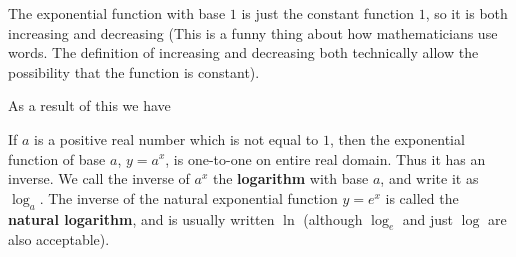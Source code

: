 \documentclass{ximera}
\begin{document}
The exponential function with base $1$ is just the constant function $1$, so it is both increasing and decreasing (This is a funny thing about how mathematicians use words.  The definition of increasing and decreasing both technically allow the possibility that the function is constant).

As a result of this we have 

\begin{theorem}
	If $a$ is a positive real number which is not equal to $1$, then the exponential function of base $a$, $y = a^x$, is one-to-one on entire real domain.  Thus it has an inverse.  We call the inverse of $a^x$ the\textbf{ logarithm} with base $a$, and write it as $\log_a$.  The inverse of the natural exponential function $y=e^x$ is called the \textbf{natural logarithm}, and is usually written $\ln$ (although $\log_e$ and just $\log$ are also acceptable).
\end{theorem}
\end{document}
